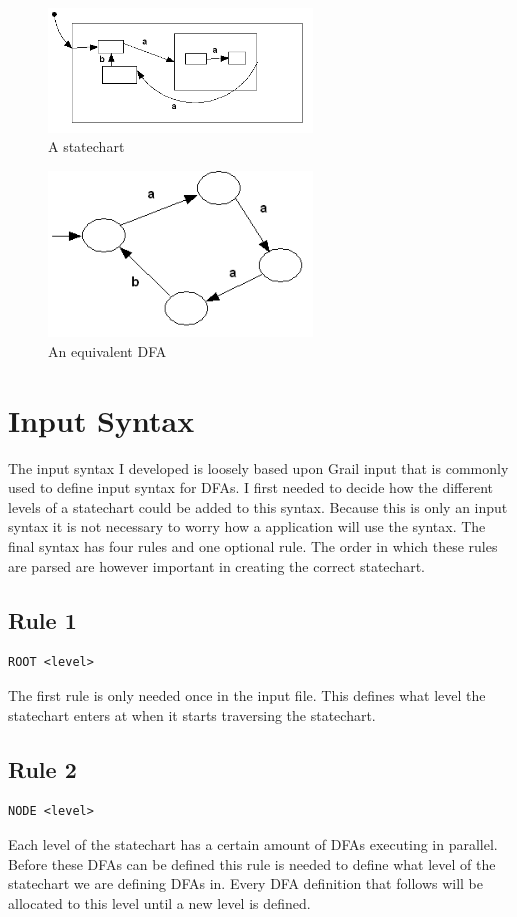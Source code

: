 \documentclass[a4paper,11pt,titlepage]{article}
\begin{document}
\begin{figure}[htbp]
   \centering
   \includegraphics[width=7cm]{state.png}
   \caption{A statechart}
   \label{Figure:statechart}
\end{figure}

\begin{figure}[htbp]
   \centering
   \includegraphics[width=7cm]{dfa.png}
   \caption{An equivalent DFA}
   \label{Figure:dfa}
\end{figure}
\newpage
\section {Input Syntax}
The input syntax I developed is loosely based upon Grail input that is commonly used to define input syntax for DFAs. I first needed to decide how the different levels of a statechart could be added to this syntax. Because this is only an input syntax it is not necessary to worry how a application will use the syntax. The final syntax has four rules and one optional rule. The order in which these rules are parsed are however important in creating the correct statechart.
\subsection{Rule 1}
\begin{verbatim}
ROOT <level>
\end{verbatim}
The first rule is only needed once in the input file. This defines what level the statechart enters at when it starts traversing the statechart.

\subsection{Rule 2}
\begin{verbatim}
NODE <level>
\end{verbatim}
Each level of the statechart has a certain amount of DFAs executing in parallel. Before these DFAs can be defined this rule is needed to define what level of the statechart we are defining DFAs in. Every DFA definition that follows will be allocated to this level until a new level is defined.
\end{document}

